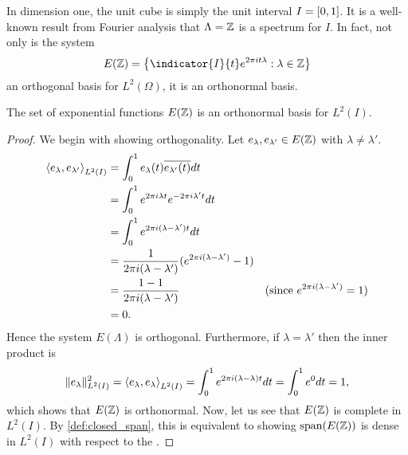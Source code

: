 \documentclass[../thesis.tex]{subfiles}
\begin{document}
In dimension one, the unit cube is simply the unit interval $I=[0,1]$. It is a well-known result from Fourier analysis that $\Lambda = \mathbb{Z}$ is a spectrum for $I$. In fact, not only is the system
\begin{equation*}
    E(\Z) = \braqMed{\indicator{I}{t} e^{2\pi i t \lambda} : \lambda \in \Z}
\end{equation*} 
an orthogonal basis for $L^2(\Omega)$, it is an orthonormal basis.
\begin{theorem}\label{lem:exp_onb_onedim}
    The set of exponential functions $E(\mathbb{Z})$ is an orthonormal basis for $L^2(I)$.
\end{theorem}
\begin{proof}
    We begin with showing orthogonality. Let $e_{\lambda}, e_{\lambda'} \in E(\mathbb{Z})$ with $\lambda \neq \lambda'$. %
    \begin{align}\label{eq:orthog_one_dim_req}
        \left \langle e_{\lambda},e_{\lambda'}  \right \rangle_{L^2(I)} &= \int_0^1 e_{\lambda}(t)\overline{e_{\lambda'}(t)} dt \nonumber\\ 
        &= \int_0^1 e^{2 \pi i {\lambda}t} e^{-2 \pi i {\lambda'}t} dt \nonumber\\
        &= \int_0^1 e^{2 \pi i (\lambda-\lambda')t} dt \nonumber\\
        &=\frac{1}{2 \pi i (\lambda-\lambda')} (e^{2 \pi i (\lambda - \lambda')} -1) \\
        &=\frac{1-1}{2 \pi i (\lambda-\lambda')} & (\text{since } e^{2 \pi i (\lambda-\lambda')} = 1) \nonumber\\
        &= 0 \nonumber.
    \end{align}
    Hence the system $E(\Lambda)$ is orthogonal. Furthermore, if $\lambda =\lambda'$ then the inner product is
    \begin{align*}\label{eq:exp_norm_one}
        \| e_\lambda \|^2_{L^2(I)} 
        = \left \langle e_{\lambda},e_{\lambda}  \right \rangle_{L^2(I)} 
        = \int_0^1 e^{2 \pi i (\lambda-\lambda)t} dt
        = \int_0^1 e^{0} dt = 1,
    \end{align*}
    which shows that $E(\mathbb{Z})$ is orthonormal. Now, let us see that $E(\mathbb{Z})$ is complete in $L^2(I)$. By \cref{def:closed_span}, this is equivalent to showing $\operatorname{span}(E(\mathbb{Z}))$ is dense in $L^2(I)$ with respect to the \Ltwonorm. 

\end{proof}
\end{document}
